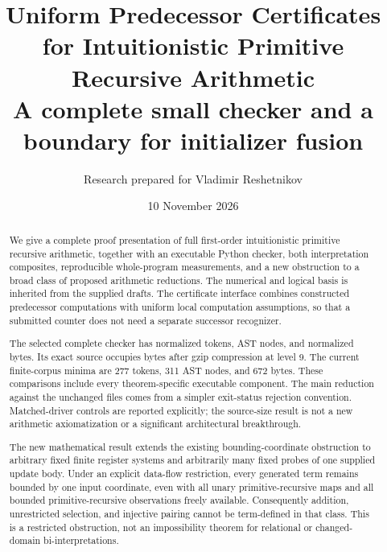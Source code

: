 \documentclass[11pt,letterpaper]{article}
\title{\color{ink}\bfseries Uniform Predecessor Certificates\\for Intuitionistic Primitive Recursive Arithmetic\\[7pt]
\large A complete small checker and a boundary for initializer fusion}
\author{Research prepared for Vladimir Reshetnikov}
\date{10 November 2026}
\theoremstyle{definition}\newtheorem{definition}[theorem]{Definition}
\theoremstyle{remark}\newtheorem{remark}[theorem]{Remark}
\begin{document}
\maketitle
\begin{abstract}
We give a complete proof presentation of full first-order intuitionistic
primitive recursive arithmetic, together with an executable Python checker,
both interpretation composites, reproducible whole-program measurements,
and a new obstruction to a broad class of proposed arithmetic reductions.
The numerical and logical basis is inherited from the supplied drafts.
The certificate interface combines constructed predecessor computations
with uniform local computation assumptions, so that a submitted counter
does not need a separate successor recognizer.

The selected complete checker has \PrimaryTokens{} normalized tokens,
\PrimaryAST{} AST nodes, and \PrimaryBytes{} normalized bytes. Its exact
source occupies \PrimaryGzip{} bytes after gzip compression at level 9.
The current finite-corpus minima are 277 tokens, 311 AST nodes, and 672
bytes. These comparisons include every theorem-specific executable
component. The main reduction against the unchanged files comes from a
simpler exit-status rejection convention. Matched-driver controls are
reported explicitly; the source-size result is not a new arithmetic
axiomatization or a significant architectural breakthrough.

The new mathematical result extends the existing bounding-coordinate
obstruction to arbitrary fixed finite register systems and arbitrarily
many fixed probes of one supplied update body. Under an explicit data-flow
restriction, every generated term remains bounded by one input coordinate,
even with all unary primitive-recursive maps and all bounded
primitive-recursive observations freely available. Consequently addition,
unrestricted selection, and injective pairing cannot be term-defined in
that class. This is a restricted obstruction, not an impossibility theorem
for relational or changed-domain bi-interpretations.
\end{abstract}
\begin{center}
\end{center}
\clearpage
\setcounter{tocdepth}{1}\tableofcontents
\clearpage

\end{document}
